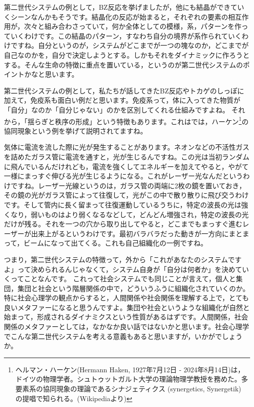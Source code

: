 \documentclass{ltjsbook}
\begin{document}
第二世代システムの例として，BZ反応を挙げましたが，他にも結晶ができていくシーンなんかもそうです。結晶化の反応が始まると，それぞれの要素の相互作用が，次々と組み合わさっていて，何か全体としての模様，系，パターンを作っていくわけです。この結晶のパターン，すなわち自分の境界が系作られていくわけですね。自分というのが，システムがどこまでが一つの塊なのか，どこまでが自己なのかを，自分で決定しようとする。しかもそれをダイナミックに作ろうとする。そんな生命の特徴に重点を置いている，というのが第二世代システムのポイントかなと思います。

第二世代システムの例として，私たちが話してきたBZ反応やトカゲのしっぽに加えて，免疫系も面白い例だと思います。免疫系って，体に入ってきた物質が「自分」なのか「自分じゃない」のかを区別してくれる仕組みですよね。
それから，「揺らぎと秩序の形成」という特徴もあります。これは\textcite{KawamotoHideo}では，ハーケン\footnote{ヘルマン・ハーケン(Hermann Haken, 1927年7月12日 - 2024年8月14日)は，ドイツの物理学者。シュトゥットガルト大学の理論物理学教授を務めた。多要素系の協同現象の理論であるシナジェティクス (synergetics, Synergetik) の提唱で知られる。(Wikipediaより)}の協同現象という例を挙げて説明されてますね。

気体に電流を流した際に光が発生することがあります。ネオンなどの不活性ガスを詰めたガラス管に電流を通すと，光が生じるんですね。この光は当初ランダムに飛んでいるんだけれども，電流を強くしてエネルギーを加えてやると，やがて一様にまっすぐ伸びる光が生じるようになる。これがレーザー光なんだというわけですね。レーザー光線というのは，ガラス管の両端に2枚の鏡を置いておき，その鏡の光がガラス管によって往復して，光がこの中で散り散りに飛び交うわけです。そして管内に長く留まって往復運動しているうちに，特定の波長の光は強くなり，弱いものはより弱くなるなどして，どんどん増強され，特定の波長の光だけが残る。それを一つの穴から取り出してやると，どこまでもまっすぐ進むレーザーが出来上がるというわけです。最初バラバラだった動きが一方向にまとまって，ビームになって出てくる。これも自己組織化の一例ですね。

つまり，第二世代システムの特徴って，外から「これがあなたのシステムですよ」って決められるんじゃなくて，システム自身が「自分は何者か」を決めていくってことなんです。
これって社会システムでも同じことが言えて，個人と集団，集団と社会という階層関係の中で，どういうふうに組織化されていくのか。特に社会心理学の観点からすると，人間関係や社会関係を理解する上で，とても良いメタファーになると思うんですよ。集団や社会というような組織化が自然と始まって，形成されるダイナミクスという性質があるはずです。人間関係，社会関係のメタファーとしては，なかなか良い話ではないかと思います。社会心理学でこんな第二世代システムを考える意義もあると思いますが，いかがでしょうか。
\end{document}
